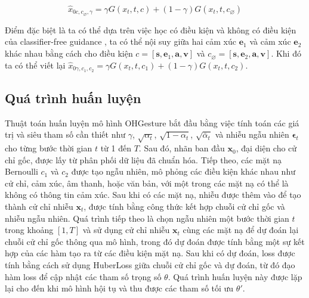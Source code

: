 
\begin{equation} \label{eq:denoise}
\hat{x}_{0 c, c_{\varnothing}, \gamma}=\gamma G \left(x_{t}, t, c\right)+(1-\gamma) G \left(x_{t}, t, c_{\varnothing}\right)
\end{equation}

Điểm đặc biệt là ta có thể dựa trên việc học có điều kiện và không có điều kiện của classifier-free guidance \cite{ho2022classifier}, ta có thể nội suy giữa hai cảm xúc $\mathbf{e}_1$ và cảm xúc $\mathbf{e}_2$ khác nhau bằng cách cho điều kiện $c = \left[\mathbf{s}, \mathbf{e}_{1}, \mathbf{a}, \mathbf{v} \right]$ và $c_\varnothing = \left[\mathbf{s}, \mathbf{e}_{2}, \mathbf{a}, \mathbf{v} \right]$. Khi đó ta có thể viết lại $\hat{x}_{0 \gamma, c_{1}, c_{2}}=\gamma G \left(x_{t}, t, c_{1} \right)+(1-\gamma) G \left(x_{t}, t, c_{2}\right)$.


\subsection{Quá trình huấn luyện}

Thuật toán huấn luyện mô hình OHGesture bắt đầu bằng việc tính toán các giá trị và siêu tham số cần thiết như $\gamma$, $\sqrt{\alpha_t}$, $\sqrt{1 - \alpha_t}$, $\sqrt{\bar{\alpha}_t}$ và nhiễu ngẫu nhiên $\boldsymbol{\epsilon}_t$ cho từng bước thời gian $t$ từ 1 đến $T$. Sau đó, nhãn ban đầu $\mathbf{x}_0$, đại diện cho cử chỉ gốc, được lấy từ phân phối dữ liệu đã chuẩn hóa. Tiếp theo, các mặt nạ Bernoulli $c_1$ và $c_2$ được tạo ngẫu nhiên, mô phỏng các điều kiện khác nhau như cử chỉ, cảm xúc, âm thanh, hoặc văn bản, với một trong các mặt nạ có thể là không có thông tin cảm xúc. Sau khi có các mặt nạ, nhiễu được thêm vào để tạo thành cử chỉ nhiễu $\mathbf{x}_t$, được tính bằng công thức kết hợp chuỗi cử chỉ gốc và nhiễu ngẫu nhiên. Quá trình tiếp theo là chọn ngẫu nhiên một bước thời gian $t$ trong khoảng $[1, T]$ và sử dụng cử chỉ nhiễu $\mathbf{x}_t$ cùng các mặt nạ để dự đoán lại chuỗi cử chỉ gốc thông qua mô hình, trong đó dự đoán được tính bằng một sự kết hợp của các hàm tạo ra từ các điều kiện mặt nạ. Sau khi có dự đoán, loss được tính bằng cách sử dụng HuberLoss giữa chuỗi cử chỉ gốc và dự đoán, từ đó đạo hàm loss để cập nhật các tham số trọng số $\theta$. Quá trình huấn luyện này được lặp lại cho đến khi mô hình hội tụ và thu được các tham số tối ưu $\theta'$.


